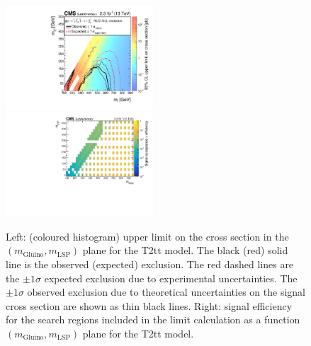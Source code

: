 \begin{figure}[t]
  \begin{center}
    \includegraphics[width=0.49\textwidth]{supplementary/figures/GenMetXSEC} \, %
    \includegraphics[width=0.49\textwidth]{supplementary/figures/T2tt_merging_4_cats} \,     
  \end{center}
  \caption{Left: (coloured histogram) upper limit on the cross section in the $(m_{\mathrm{Gluino}},m_{\mathrm{LSP}})$ plane for the T2tt model. 
  The black (red) solid line is the observed (expected) exclusion. The red dashed lines are the $\pm1\sigma$ expected exclusion due to experimental uncertainties. 
  The $\pm1\sigma$ observed exclusion due to theoretical uncertainties on the signal cross section are shown as thin black lines. 
  Right: signal efficiency for the search regions included in the limit calculation as a function $(m_{\mathrm{Gluino}},m_{\mathrm{LSP}})$ plane for the T2tt model. 
  \label{fig:T2tt_excl}}
\end{figure}


